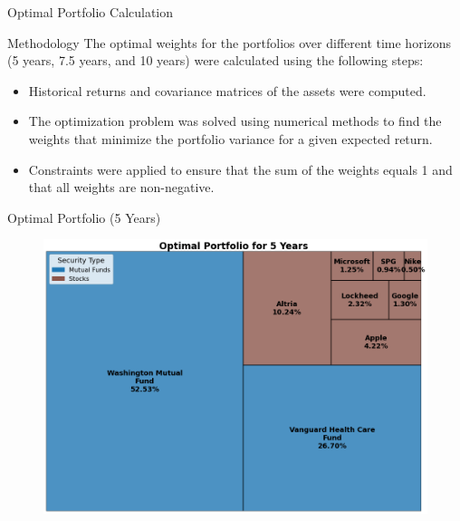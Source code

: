 \documentclass{beamer}
\begin{document}
\begin{frame}{Optimal Portfolio Calculation}
    \begin{block}{Methodology}
        The optimal weights for the portfolios over different time horizons (5 years, 7.5 years, and 10 years) were calculated using the following steps:
        \begin{itemize}
            \item Historical returns and covariance matrices of the assets were computed.
            \item The optimization problem was solved using numerical methods to find the weights that minimize the portfolio variance for a given expected return.
            \item Constraints were applied to ensure that the sum of the weights equals 1 and that all weights are non-negative.
        \end{itemize}
    \end{block}
\end{frame}

\begin{frame}{Optimal Portfolio (5 Years)}
    \begin{figure}
        \centering
        \includegraphics[height=0.8\textheight]{optimal_portfolio_5_years.png}
    \end{figure}
\end{frame}
\end{document}
